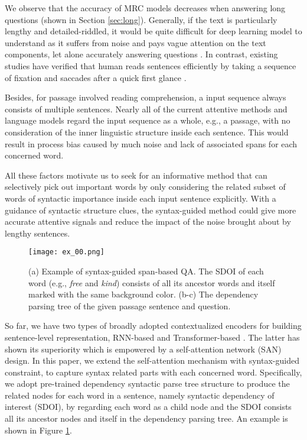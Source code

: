 \documentclass[letterpaper]{article} \usepackage{color}
\begin{document}
We observe that the accuracy of MRC models decreases when answering long questions (shown in Section \ref{sec:long}). Generally, if the text is particularly lengthy and detailed-riddled, it would be quite difficult for deep learning model to understand as it suffers from noise and pays vague attention on the text components, let alone accurately answering questions \cite{zhang2018modeling}. In contrast, existing studies have verified that human reads sentences efficiently by taking a sequence of fixation and saccades after a quick first glance \cite{P17-1172}. 

Besides, for passage involved reading comprehension, a input sequence always consists of multiple sentences. Nearly all of the current attentive methods and language models regard the input sequence as a whole, e.g., a passage, with no consideration of the inner linguistic structure inside each sentence. This would result in process bias caused by much noise and lack of associated spans for each concerned word. 

All these factors motivate us to seek for an informative method that can selectively pick out important words by only considering the related subset of words of syntactic importance inside each input sentence explicitly. With a guidance of syntactic structure clues, the syntax-guided method could give more accurate attentive signals and reduce the impact of the noise brought about by lengthy sentences. 

\begin{figure}
	\centering
	\texttt{[image: ex\_00.png]}
	\caption{(a) Example of syntax-guided span-based QA. The SDOI of each word (e.g., \emph{free} and \emph{kind}) consists of all its ancestor words and itself marked with the same background color. (b-c) The dependency parsing tree of the given passage sentence and question.}
	\label{exp_dep}
\end{figure}

So far, we have two types of broadly adopted contextualized encoders for building sentence-level representation, RNN-based and Transformer-based \cite{vaswani2017attention}. The latter has shown its superiority which is empowered by a self-attention network (SAN) design. In this paper, we extend the self-attention mechanism with syntax-guided constraint, to capture syntax related parts with each concerned word. Specifically, we adopt pre-trained dependency syntactic parse tree structure to produce the related nodes for each word in a sentence, namely syntactic dependency of interest (SDOI), by regarding each word as a child node and the SDOI consists all its ancestor nodes and itself in the dependency parsing tree. An example is shown in Figure \ref{exp_dep}. 
\end{document}
